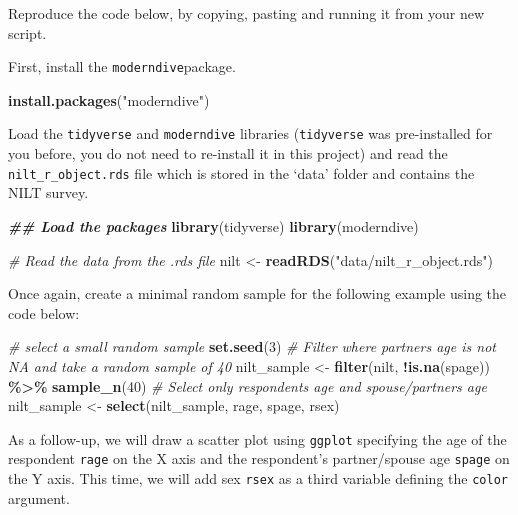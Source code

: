 \documentclass[
]{book}
\newenvironment{Shaded}{\begin{snugshade}}{\end{snugshade}}
\newcommand{\CommentTok}[1]{\textcolor[rgb]{0.56,0.35,0.01}{\textit{#1}}}
\newcommand{\DecValTok}[1]{\textcolor[rgb]{0.00,0.00,0.81}{#1}}
\newcommand{\DocumentationTok}[1]{\textcolor[rgb]{0.56,0.35,0.01}{\textbf{\textit{#1}}}}
\newcommand{\FunctionTok}[1]{\textcolor[rgb]{0.13,0.29,0.53}{\textbf{#1}}}
\newcommand{\NormalTok}[1]{#1}
\newcommand{\OtherTok}[1]{\textcolor[rgb]{0.56,0.35,0.01}{#1}}
\newcommand{\SpecialCharTok}[1]{\textcolor[rgb]{0.81,0.36,0.00}{\textbf{#1}}}
\newcommand{\StringTok}[1]{\textcolor[rgb]{0.31,0.60,0.02}{#1}}
\begin{document}
Reproduce the code below, by copying, pasting and running it from your new script.

First, install the \texttt{moderndive}package.

\begin{Shaded}
\begin{Highlighting}[]
\FunctionTok{install.packages}\NormalTok{(}\StringTok{"moderndive"}\NormalTok{)}
\end{Highlighting}
\end{Shaded}

Load the \texttt{tidyverse} and \texttt{moderndive} libraries (\texttt{tidyverse} was pre-installed for you before, you do not need to re-install it in this project) and read the \texttt{nilt\_r\_object.rds} file which is stored in the `data' folder and contains the NILT survey.

\begin{Shaded}
\begin{Highlighting}[]
\DocumentationTok{\#\# Load the packages}
\FunctionTok{library}\NormalTok{(tidyverse)}
\FunctionTok{library}\NormalTok{(moderndive)}

\CommentTok{\# Read the data from the .rds file}
\NormalTok{nilt }\OtherTok{\textless{}{-}} \FunctionTok{readRDS}\NormalTok{(}\StringTok{"data/nilt\_r\_object.rds"}\NormalTok{)}
\end{Highlighting}
\end{Shaded}

Once again, create a minimal random sample for the following example using the code below:

\begin{Shaded}
\begin{Highlighting}[]
\CommentTok{\# select a small random sample}
\FunctionTok{set.seed}\NormalTok{(}\DecValTok{3}\NormalTok{)}
\CommentTok{\# Filter where partner\textquotesingle{}s age is not NA and take a random sample of 40}
\NormalTok{nilt\_sample }\OtherTok{\textless{}{-}} \FunctionTok{filter}\NormalTok{(nilt, }\SpecialCharTok{!}\FunctionTok{is.na}\NormalTok{(spage)) }\SpecialCharTok{\%\textgreater{}\%} \FunctionTok{sample\_n}\NormalTok{(}\DecValTok{40}\NormalTok{)}
\CommentTok{\# Select only respondent\textquotesingle{}s age and spouse/partner\textquotesingle{}s age}
\NormalTok{nilt\_sample }\OtherTok{\textless{}{-}} \FunctionTok{select}\NormalTok{(nilt\_sample, rage, spage, rsex)}
\end{Highlighting}
\end{Shaded}

As a follow-up, we will draw a scatter plot using \texttt{ggplot} specifying the age of the respondent \texttt{rage} on the X axis and the respondent's partner/spouse age \texttt{spage} on the Y axis. This time, we will add sex \texttt{rsex} as a third variable defining the \texttt{color} argument.
\end{document}
